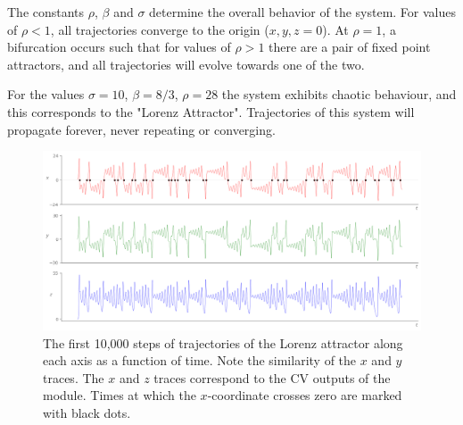 \documentclass{tufte-handout}
\begin{document}
The constants $\rho$, $\beta$ and $\sigma$ determine the overall behavior of the system. For values of $\rho < 1$, all trajectories converge to the origin ($x, y, z = 0$). At $\rho=1$, a bifurcation occurs such that for values of $\rho > 1$ there are a pair of fixed point attractors, and all trajectories will evolve towards one of the two. 

For the values $\sigma=10$, $\beta=8/3$, $\rho=28$ the system exhibits chaotic behaviour, and this corresponds to the "Lorenz Attractor". Trajectories of this system will propagate forever, never repeating or converging.



\begin{figure}[h]
  \includegraphics[width=\linewidth]{control_voltages.png}%
  \caption{The first 10,000 steps of trajectories of the Lorenz attractor along each axis as a function of time. Note the similarity of the $x$ and $y$ traces. The $x$ and $z$ traces correspond to the CV outputs of the module. Times at which the $x$-coordinate crosses zero are marked with black dots.}%
  \label{fig:control_voltages}%
\end{figure}








\end{document}
